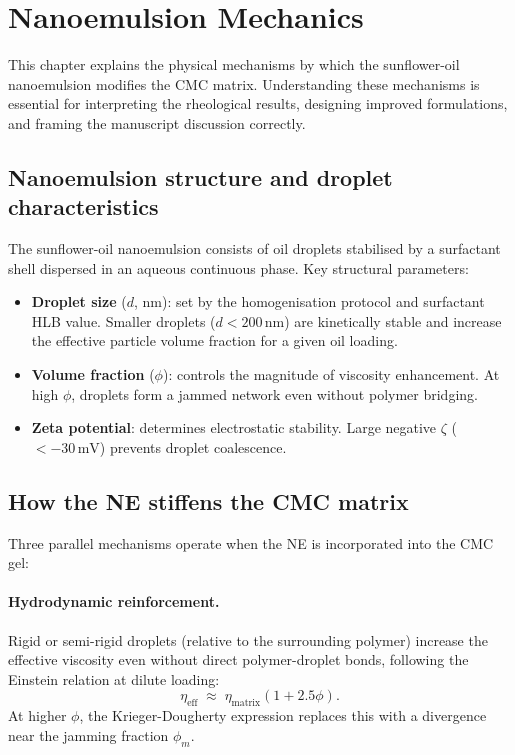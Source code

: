 \documentclass[11pt,a4paper]{article}
\begin{document}
\section{Nanoemulsion Mechanics}
\label{sec:ne_mechanics}

This chapter explains the physical mechanisms by which the sunflower-oil
nanoemulsion modifies the CMC matrix. Understanding these mechanisms is
essential for interpreting the rheological results, designing improved
formulations, and framing the manuscript discussion correctly.

\subsection{Nanoemulsion structure and droplet characteristics}

The sunflower-oil nanoemulsion consists of oil droplets stabilised by
a surfactant shell dispersed in an aqueous continuous phase. Key
structural parameters:

\begin{itemize}[leftmargin=1.6em,itemsep=2pt]
\item \textbf{Droplet size} ($d$, nm): set by the homogenisation protocol
  and surfactant HLB value. Smaller droplets ($d<200\,\si{\nm}$) are
  kinetically stable and increase the effective particle volume fraction
  for a given oil loading.
\item \textbf{Volume fraction} ($\phi$): controls the magnitude of
  viscosity enhancement. At high $\phi$, droplets form a jammed network
  even without polymer bridging.
\item \textbf{Zeta potential}: determines electrostatic stability.
  Large negative $\zeta$ ($<-30\,\si{\mV}$) prevents droplet coalescence.
\end{itemize}

\subsection{How the NE stiffens the CMC matrix}

Three parallel mechanisms operate when the NE is incorporated into the
CMC gel:

\paragraph{Hydrodynamic reinforcement.} Rigid or semi-rigid droplets
(relative to the surrounding polymer) increase the effective viscosity
even without direct polymer-droplet bonds, following the Einstein
relation at dilute loading:
\begin{equation}
\eta_\mathrm{eff} \;\approx\; \eta_\mathrm{matrix}(1+2.5\phi).
\label{eq:einstein}
\end{equation}
At higher $\phi$, the Krieger-Dougherty expression replaces this with
a divergence near the jamming fraction $\phi_m$.
\end{document}
